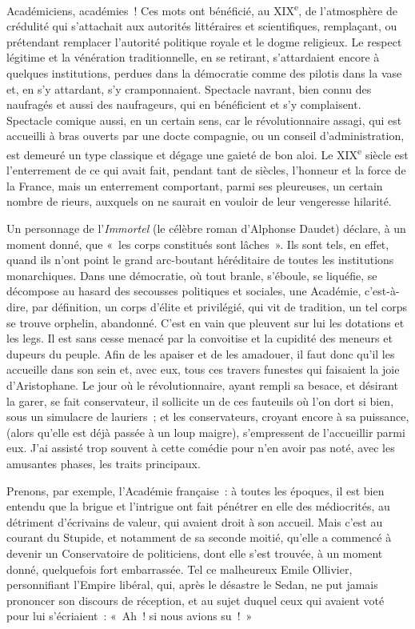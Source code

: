 \documentclass[french,twoside]{book} %
\begin{document}
Académiciens, académies ! Ces mots ont bénéficié, au XIX\textsuperscript{e}, de l’atmosphère de crédulité qui s’attachait aux autorités littéraires et scientifiques, remplaçant, ou prétendant remplacer l’autorité politique royale et le dogme religieux. Le respect légitime et la vénération traditionnelle, en se retirant, s’attardaient encore à quelques institutions, perdues dans la démocratie comme des pilotis dans la vase et, en s’y attardant, s’y cramponnaient. Spectacle navrant, bien connu des naufragés et aussi des naufrageurs, qui en bénéficient et s’y complaisent. Spectacle comique aussi, en un certain sens, car le révolutionnaire assagi, qui est accueilli à bras ouverts par une docte compagnie, ou un conseil d’administration, est demeuré un type classique et dégage une gaieté de bon aloi. Le XIX\textsuperscript{e} siècle est l’enterrement de ce qui avait fait, pendant tant de siècles, l’honneur et la force de la France, mais un enterrement comportant, parmi ses pleureuses, un certain nombre de rieurs, auxquels on ne saurait en vouloir de leur vengeresse hilarité.\par
Un personnage de l’{\itshape Immortel} (le célèbre roman d’Alphonse Daudet) déclare, à un moment donné, que « les corps constitués sont lâches ». Ils sont tels, en effet, quand ils n’ont point le grand arc-boutant héréditaire de toutes les institutions monarchiques. Dans une démocratie, où tout branle, s’éboule, se liquéfie, se décompose au hasard des secousses politiques et sociales, une Académie, c’est-à-dire, par définition, un corps d’élite et privilégié, qui vit de tradition, un tel corps se trouve orphelin, abandonné. C’est en vain que pleuvent sur lui les dotations et les legs. Il est sans cesse menacé par la convoitise et la cupidité des meneurs et dupeurs du peuple. Afin de les apaiser et de les amadouer, il faut donc qu’il les accueille dans son sein et, avec eux, tous ces travers funestes qui faisaient la joie d’Aristophane. Le jour où le révolutionnaire, ayant rempli sa besace, et désirant la garer, se fait conservateur, il sollicite un de ces fauteuils où l’on dort si bien, sous un simulacre de lauriers ; et les conservateurs, croyant encore à sa puissance, (alors qu’elle est déjà passée à un loup maigre), s’empressent de l’accueillir parmi eux. J’ai assisté trop souvent à cette comédie pour n’en avoir pas noté, avec les amusantes phases, les traits principaux.\par
Prenons, par exemple, l’Académie française : à toutes les époques, il est bien entendu que la brigue et l’intrigue ont fait pénétrer en elle des médiocrités, au détriment d’écrivains de valeur, qui avaient droit à son accueil. Mais c’est au courant du Stupide, et notamment de sa seconde moitié, qu’elle a commencé à devenir un Conservatoire de politiciens, dont elle s’est trouvée, à un moment donné, quelquefois fort embarrassée. Tel ce malheureux Emile Ollivier, personnifiant l’Empire libéral, qui, après le désastre le Sedan, ne put jamais prononcer son discours de réception, et au sujet duquel ceux qui avaient voté pour lui s’écriaient : « Ah ! si nous avions su ! »\par
\end{document}
